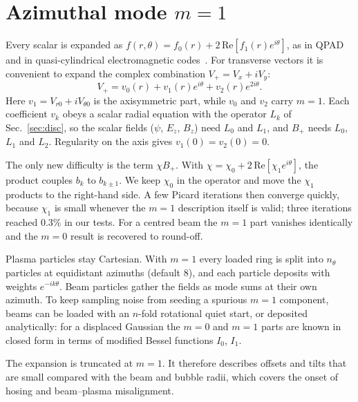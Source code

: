 \documentclass[aps,prab,reprint,floatfix,superscriptaddress,amsmath,amssymb]{revtex4-2}
\begin{document}
\section{Azimuthal mode $m=1$}\label{sec:m1}

Every scalar is expanded as $f(r,\theta) = f_0(r) + 2\,\mathrm{Re}[f_1(r)e^{i\theta}]$, as in QPAD~\cite{Li2021} and in quasi-cylindrical electromagnetic codes~\cite{Lifschitz2009}. For transverse vectors it is convenient to expand the complex combination $V_+ = V_x + iV_y$:
\begin{equation}
V_+ = v_0(r) + v_1(r)e^{i\theta} + v_2(r)e^{2i\theta}. \label{eq:vplus}
\end{equation}
Here $v_1 = V_{r0} + iV_{\theta0}$ is the axisymmetric part, while $v_0$ and $v_2$ carry $m=1$. Each coefficient $v_k$ obeys a scalar radial equation with the operator $L_k$ of Sec.~\ref{sec:disc}, so the scalar fields ($\psi$, $E_z$, $B_z$) need $L_0$ and $L_1$, and $B_+$ needs $L_0$, $L_1$ and $L_2$. Regularity on the axis gives $v_1(0) = v_2(0) = 0$.

The only new difficulty is the term $\chi B_+$. With $\chi = \chi_0 + 2\,\mathrm{Re}[\chi_1 e^{i\theta}]$, the product couples $b_k$ to $b_{k\pm1}$. We keep $\chi_0$ in the operator and move the $\chi_1$ products to the right-hand side. A few Picard iterations then converge quickly, because $\chi_1$ is small whenever the $m=1$ description itself is valid; three iterations reached 0.3\% in our tests. For a centred beam the $m=1$ part vanishes identically and the $m=0$ result is recovered to round-off.

Plasma particles stay Cartesian. With $m=1$ every loaded ring is split into $n_\theta$ particles at equidistant azimuths (default 8), and each particle deposits with weights $e^{-ik\theta}$. Beam particles gather the fields as mode sums at their own azimuth. To keep sampling noise from seeding a spurious $m=1$ component, beams can be loaded with an $n$-fold rotational quiet start, or deposited analytically: for a displaced Gaussian the $m=0$ and $m=1$ parts are known in closed form in terms of modified Bessel functions $I_0$, $I_1$.

The expansion is truncated at $m=1$. It therefore describes offsets and tilts that are small compared with the beam and bubble radii, which covers the onset of hosing and beam--plasma misalignment.

\end{document}
